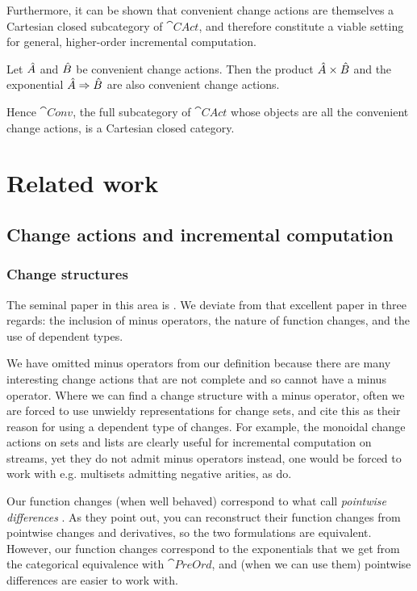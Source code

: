 Furthermore, it can be shown that convenient change actions are themselves a Cartesian closed
subcategory of $\cat{CAct}$, and therefore constitute a viable setting for general, higher-order
incremental computation.

\begin{prop}[name=Convenient category of change actions]
  Let $\hat{A}$ and $\hat{B}$ be convenient change actions. Then the product 
  $\hat{A} \times \hat{B}$ and the exponential $\hat{A} \Rightarrow \hat{B}$ are also convenient
  change actions.
  
  Hence $\cat{Conv}$, the full subcategory of $\cat{CAct}$ whose objects are all the convenient change
  actions, is a Cartesian closed category.
\end{prop}

\section{Related work}

\subsection{Change actions and incremental computation}

\subsubsection{Change structures}
\label{sec:relatedChangeStructures}

The seminal paper in this area is \textcite{cai2014changes}. We deviate from
that excellent paper in three regards: the
inclusion of minus operators, the nature of function changes, and the use of
dependent types.

We have omitted minus operators from our definition because
there are many interesting change actions that are not complete and so cannot
have a minus operator. Where we can find a change structure with a minus operator, often we are
forced to use unwieldy representations for change sets, and
\citeauthor{cai2014changes} cite this as their reason for using a dependent
type of changes. For example, the monoidal change actions on sets and lists are clearly
useful for incremental computation on streams, yet they do not admit minus
operators \textemdash{} instead, one would
be forced to work with e.g. multisets admitting negative arities, as \citeauthor{cai2014changes} do.

Our function changes (when well behaved) correspond to what \citeauthor{cai2014changes} call
\emph{pointwise differences} \autocite[see][section 2.2]{cai2014changes}. As
they point out, you can reconstruct their
function changes from pointwise changes and derivatives, so the two formulations
are equivalent. However, our function changes correspond to the
exponentials that we get from the categorical equivalence with $\cat{PreOrd}$,
and (when we can use them) pointwise differences are easier to work with.


